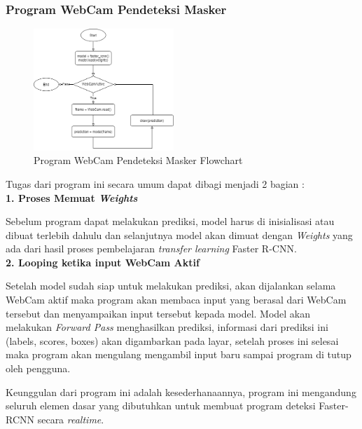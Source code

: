 \documentclass{article}
\begin{document}
	\subsubsection{Program WebCam Pendeteksi Masker}
	\begin{figure}[H]
  		\centering
  		\includegraphics[width=200px]{arsitektur/Sequential Model.png}
  		\caption{Program WebCam Pendeteksi Masker Flowchart}
	\end{figure}
	Tugas dari program ini secara umum dapat dibagi menjadi 2 bagian : \\
	{\textbf{1. Proses Memuat \textit{Weights}}}
	\par Sebelum program dapat melakukan prediksi, model harus di inisialisasi atau dibuat terlebih dahulu dan selanjutnya model akan dimuat dengan \textit{Weights} yang ada dari hasil proses pembelajaran \textit{transfer learning} Faster R-CNN.\\
	{\textbf{2. Looping ketika input WebCam Aktif}}
	\par Setelah model sudah siap untuk melakukan prediksi, akan dijalankan selama WebCam aktif maka program akan membaca input yang berasal dari WebCam tersebut dan menyampaikan input tersebut kepada model. Model akan melakukan \textit{Forward Pass} menghasilkan prediksi, informasi dari prediksi ini (labels, scores, boxes) akan digambarkan pada layar, setelah proses ini selesai maka program akan mengulang mengambil input baru sampai program di tutup oleh pengguna.\\
	\par Keunggulan dari program ini adalah kesederhanaannya, program ini mengandung seluruh elemen dasar yang dibutuhkan untuk membuat program deteksi Faster-RCNN secara \textit{realtime}.
\end{document}
